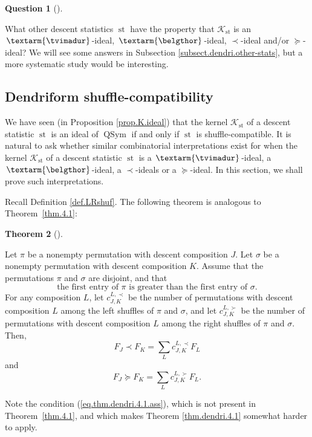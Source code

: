 \documentclass[numbers=enddot,12pt,final,onecolumn,notitlepage]{scrartcl}%
\theoremstyle{definition}
\newtheorem{theo}{Theorem}[section]
\newenvironment{theorem}[1][]
{\begin{theo}[#1]\begin{leftbar}}
{\end{leftbar}\end{theo}}
\newtheorem{quest}[theo]{Question}
\newenvironment{question}[1][]
{\begin{quest}[#1]\begin{leftbar}}
{\end{leftbar}\end{quest}}
\newenvironment{question}[1][Question]{\noindent\textbf{#1.} }{\ \rule{0.5em}{0.5em}}
\newcommand{\tvi}{\left. \textarm{\tvimadur} \right.}
\newcommand{\bel}{\left. \textarm{\belgthor} \right.}
\let\sumnonlimits\sum
\renewcommand{\sum}{\sumnonlimits\limits}
\begin{document}
\begin{question}
What other descent statistics $\operatorname*{st}$ have the property that
$\mathcal{K}_{\operatorname*{st}}$ is an $\tvi$-ideal, $\bel$-ideal, $\left.
\prec\right.  $-ideal and/or $\left.  \succeq\right.  $-ideal? We will see
some answers in Subsection \ref{subsect.dendri.other-stats}, but a more
systematic study would be interesting.
\end{question}

\subsection{Dendriform shuffle-compatibility}

We have seen (in Proposition \ref{prop.K.ideal}) that the kernel
$\mathcal{K}_{\operatorname*{st}}$ of a descent statistic $\operatorname*{st}$
is an ideal of $\operatorname*{QSym}$ if and only if $\operatorname*{st}$ is
shuffle-compatible. It is natural to ask whether similar combinatorial
interpretations exist for when the kernel $\mathcal{K}_{\operatorname*{st}}$
of a descent statistic $\operatorname*{st}$ is a $\tvi$-ideal, a $\bel$-ideal,
a $\left.  \prec\right.  $-ideals or a $\left.  \succeq\right.  $-ideal. In
this section, we shall prove such interpretations.

Recall Definition \ref{def.LRshuf}. The following theorem is analogous to
Theorem~\ref{thm.4.1}:

\begin{theorem}
\label{thm.dendri.4.1}Let $\pi$ be a nonempty permutation with descent
composition $J$. Let $\sigma$ be a nonempty permutation with descent
composition $K$. Assume that the permutations $\pi$ and $\sigma$ are disjoint,
and that%
\begin{equation}
\text{the first entry of }\pi\text{ is greater than the first entry of }%
\sigma\text{.} \label{eq.thm.dendri.4.1.ass}%
\end{equation}
For any composition $L$, let $c_{J,K}^{L,\prec}$ be the number of permutations
with descent composition $L$ among the left shuffles of $\pi$ and $\sigma$,
and let $c_{J,K}^{L,\succ}$ be the number of permutations with descent
composition $L$ among the right shuffles of $\pi$ and $\sigma$. Then,%
\[
F_{J}\left.  \prec\right.  F_{K}=\sum_{L}c_{J,K}^{L,\prec}F_{L}%
\]
and%
\[
F_{J}\left.  \succeq\right.  F_{K}=\sum_{L}c_{J,K}^{L,\succ}F_{L}.
\]

\end{theorem}

Note the condition (\ref{eq.thm.dendri.4.1.ass}), which is not present in
Theorem~\ref{thm.4.1}, and which makes Theorem \ref{thm.dendri.4.1} somewhat
harder to apply.
\end{document}
